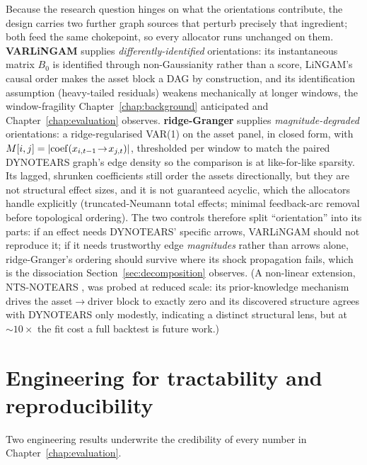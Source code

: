 Because the research question hinges on what the orientations contribute, the design
carries two further graph sources that perturb precisely that ingredient;
both feed the same chokepoint, so every allocator runs unchanged on them.
\textbf{VARLiNGAM} \cite{hyvarinen2010varlingam} supplies
\emph{differently-identified} orientations: its instantaneous matrix $B_0$
is identified through non-Gaussianity rather than a score, LiNGAM's causal
order makes the asset block a DAG by construction, and its identification
assumption (heavy-tailed residuals) weakens mechanically at longer
windows, the window-fragility Chapter~\ref{chap:background} anticipated and
Chapter~\ref{chap:evaluation} observes. \textbf{ridge-Granger} supplies
\emph{magnitude-degraded} orientations: a ridge-regularised VAR(1) on the
asset panel, in closed form, with
$M[i,j] = |{\rm coef}(x_{i,t-1}\!\to\!x_{j,t})|$, thresholded per window
to match the paired DYNOTEARS graph's edge density so the comparison is at
like-for-like sparsity. Its lagged, shrunken coefficients still order the
assets directionally, but they are not structural effect sizes, and it
is not guaranteed acyclic, which the allocators handle explicitly
(truncated-Neumann total effects; minimal feedback-arc removal before
topological ordering). The two controls therefore split ``orientation''
into its parts: if an effect needs DYNOTEARS' specific arrows, VARLiNGAM
should not reproduce it; if it needs trustworthy edge \emph{magnitudes}
rather than arrows alone, ridge-Granger's ordering should survive where its
shock propagation fails, which is the dissociation
Section~\ref{sec:decomposition} observes. (A
non-linear extension, NTS-NOTEARS \cite{sun2023ntsnotears}, was probed at
reduced scale: its prior-knowledge mechanism drives the asset$\to$driver
block to exactly zero and its discovered structure agrees with DYNOTEARS
only modestly, indicating a distinct structural lens, but at
${\sim}10\times$ the fit
cost a full backtest is future work.)

\section{Engineering for tractability and reproducibility}
\label{sec:cache}

Two engineering results underwrite the credibility of every number in
Chapter~\ref{chap:evaluation}.

